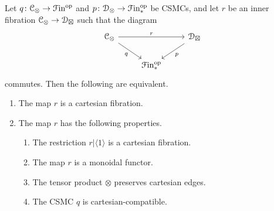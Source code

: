 \documentclass[main.tex]{subfiles}
\begin{document}
\begin{lemma}
  \label{lemma:equivalent_conditions_to_be_cartesan}
  Let $q\colon \mathcal{C}_{\otimes} \to \mathcal{F}\mathrm{in}^{\mathrm{op}}$ and $p\colon \mathcal{D}_{\otimes} \to \mathcal{F}\mathrm{in}_{*}^{\mathrm{op}}$ be CSMCs, and let $r$ be an inner fibration $\mathcal{C}_{\otimes} \to \mathcal{D}_{\boxtimes}$ such that the diagram
  \begin{equation*}
    \begin{tikzcd}
      \category{C}_{\otimes}
      \arrow[rr, "r"]
      \arrow[dr, swap, "q"]
      && \category{D}_{\boxtimes}
      \arrow[dl, "p"]
      \\
      & \Finp\op
    \end{tikzcd}
  \end{equation*}
  commutes. Then the following are equivalent.
  \begin{enumerate}
    \item The map $r$ is a cartesian fibration.

    \item The map $r$ has the following properties.
      \begin{enumerate}
        \item The restriction $r|\langle 1 \rangle$ is a cartesian fibration.

        \item The map $r$ is a monoidal functor.

        \item The tensor product $\otimes$ preserves cartesian edges.

        \item The CSMC $q$ is cartesian-compatible.
      \end{enumerate}
  \end{enumerate}
\end{lemma}
\end{document}
